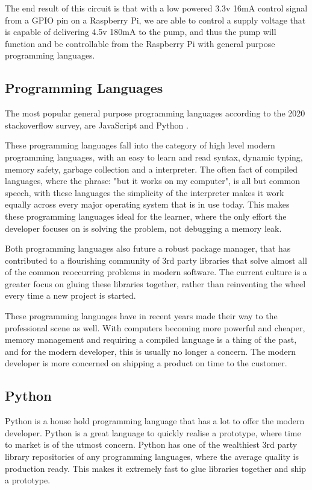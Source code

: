 \documentclass[a4paper,12pt,twoside,openright,titlepage]{book}
\begin{document}
The end result of this circuit is that with a low powered 3.3v 16mA control signal from a GPIO pin on a Raspberry Pi, we are able to control a supply voltage that is capable of delivering 4.5v 180mA to the pump, and thus the pump will function and be controllable from the Raspberry Pi with general purpose programming languages.

\subsection{Programming Languages}
The most popular general purpose programming languages according to the 2020 stackoverflow survey, are JavaScript and Python \cite{stackoverflow_survey}.

These programming languages fall into the category of high level modern programming languages, with an easy to learn and read syntax, dynamic typing, memory safety, garbage collection and a interpreter. 
The often fact of compiled languages, where the phrase: "but it works on my computer", is all but common speech, with these languages the simplicity of the interpreter makes it work equally across every major operating system that is in use today.
This makes these programming languages ideal for the learner, where the only effort the developer focuses on is solving the problem, not debugging a memory leak.

Both programming languages also future a robust package manager, that has contributed to a flourishing community of 3rd party libraries that solve almost all of the common reoccurring problems in modern software. The current culture is a greater focus on gluing these libraries together, rather than reinventing the wheel every time a new project is started.

These programming languages have in recent years made their way to the professional scene as well. With computers becoming more powerful and cheaper, memory management and requiring a compiled language is a thing of the past, and for the modern developer, this is usually no longer a concern.
The modern developer is more concerned on shipping a product on time to the customer.

\subsection{Python}
Python is a house hold programming language that has a lot to offer the modern developer. Python is a great language to quickly realise a prototype, where time to market is of the utmost concern.
Python has one of the wealthiest 3rd party library repositories of any programming languages, where the average quality is production ready. This makes it extremely fast to glue libraries together and ship a prototype.
\end{document}
